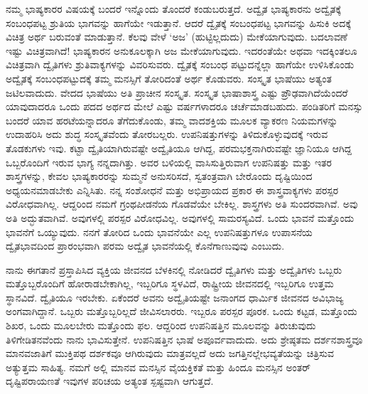 ನಮ್ಮ ಭಾಷ್ಯಕಾರರ ವಿಷಯಕ್ಕೆ ಬಂದರೆ ಇನ್ನೊಂದು ತೊಂದರೆ ಕಂಡುಬರುತ್ತದೆ. ಅದ್ವೈತ ಭಾಷ್ಯಕಾರನು ಅದ್ವೈತಕ್ಕೆ ಸಂಬಂಧಪಟ್ಟ ಶ್ರುತಿಯ ಭಾಗವನ್ನು ಹಾಗೆಯೇ ಇಡುತ್ತಾನೆ. ಆದರೆ ದ್ವೈತಕ್ಕೆ ಸಂಬಂಧಪಟ್ಟ ಭಾಗವನ್ನು ಹಿಸುಕಿ ಅದಕ್ಕೆ ವಿಚಿತ್ರ ಅರ್ಥ ಬರುವಂತೆ ಮಾಡುತ್ತಾನೆ. ಕೆಲವು ವೇಳೆ ‘ಅಜ’ (ಹುಟ್ಟಿಲ್ಲದುದು) ಮೇಕೆಯಾಗುವುದು. ಬದಲಾವಣೆ ಇಷ್ಟು ವಿಚಿತ್ರವಾಗಿದೆ! ಭಾಷ್ಯಕಾರನ ಅನುಕೂಲಕ್ಕಾಗಿ ಅಜ ಮೇಕೆಯಾಗುವುದು. ಇದರಂತೆಯೇ ಅಥವಾ ಇದಕ್ಕಿಂತಲೂ ವಿಚಿತ್ರವಾಗಿ ದ್ವೈತಿಗಳು ಶ್ರುತಿವಾಕ್ಯಗಳನ್ನು ವಿವರಿಸುವರು. ದ್ವೈತಕ್ಕೆ ಸಂಬಂಧ ಪಟ್ಟುದನ್ನೆಲ್ಲಾ ಹಾಗೆಯೇ ಉಳಿಸಿಕೊಂಡು ಅದ್ವೈತಕ್ಕೆ ಸಂಬಂಧಪಟ್ಟುದಕ್ಕೆ ತಮ್ಮ ಮನಸ್ಸಿಗೆ ತೋರಿದಂತೆ ಅರ್ಥ ಕೊಡುವರು. ಸಂಸ್ಕೃತ ಭಾಷೆಯು ಅತ್ಯಂತ ಜಟಿಲವಾದುದು. ವೇದದ ಭಾಷೆಯು ಅತಿ ಪ್ರಾಚೀನ ಸಂಸ್ಕೃತ. ಸಂಸ್ಕೃತ ಭಾಷಾಶಾಸ್ತ್ರ ಎಷ್ಟು ಪ್ರೌಢವಾಗಿದೆಯೆಂದರೆ ಯಾವುದಾದರೂ ಒಂದು ಪದದ ಅರ್ಥದ ಮೇಲೆ ಎಷ್ಟು ವರ್ಷಗಳಾದರೂ ಚರ್ಚೆಮಾಡಬಹುದು. ಪಂಡಿತರಿಗೆ ಮನಸ್ಸು ಬಂದರೆ ಯಾವ ಹರಟೆಯನ್ನಾದರೂ ತೆಗೆದುಕೊಂಡು, ತಮ್ಮ ವಾದಶಕ್ತಿಯ ಮೂಲಕ ವ್ಯಾಕರಣ ನಿಯಮಗಳನ್ನು ಉದಾಹರಿಸಿ ಅದು ಶುದ್ಧ ಸಂಸ್ಕೃತವೆಂದು ತೋರಬಲ್ಲರು. ಉಪನಿಷತ್ತುಗಳನ್ನು ತಿಳಿದುಕೊಳ್ಳುವುದಕ್ಕೆ ಇರುವ ತೊಡಕುಗಳು ಇವು. ಕಟ್ಟಾ ದ್ವೈತಿಯಾಗಿರುವಷ್ಟೇ ಅದ್ವೈತಿಯೂ ಆಗಿದ್ದ, ಪರಮಭಕ್ತನಾಗಿರುವಷ್ಟೇ ಜ್ಞಾನಿಯೂ ಆಗಿದ್ದ ಒಬ್ಬರೊಂದಿಗೆ ಇರುವ ಭಾಗ್ಯ ನನ್ನದಾಗಿತ್ತು. ಅವರ ಬಳಿಯಲ್ಲಿ ವಾಸಿಸುತ್ತಿರುವಾಗ ಉಪನಿಷತ್ತು ಮತ್ತು ಇತರ ಶಾಸ್ತ್ರಗಳನ್ನು, ಕೇವಲ ಭಾಷ್ಯಕಾರರನ್ನು ಸುಮ್ಮನೆ ಅನುಸರಿಸದೆ, ಸ್ವತಂತ್ರವಾಗಿ ಬೇರೊಂದು ದೃಷ್ಟಿಯಿಂದ ಅಧ್ಯಯನಮಾಡಬೇಕು ಎನ್ನಿಸಿತು. ನನ್ನ ಸಂಶೋಧನೆ ಮತ್ತು ಅಭಿಪ್ರಾಯದ ಪ್ರಕಾರ ಈ ಶಾಸ್ತ್ರವಾಕ್ಯಗಳು ಪರಸ್ಪರ ವಿರೋಧವಾಗಿಲ್ಲ. ಆದ್ದರಿಂದ ನಮಗೆ ಗ್ರಂಥಪೀಡನೆಯ ಗೊಡವೆಯೇ ಬೇಕಿಲ್ಲ. ಶಾಸ್ತ್ರಗಳು ಅತಿ ಸುಂದರವಾಗಿವೆ. ಅವು ಅತಿ ಅದ್ಭುತವಾಗಿವೆ. ಅವುಗಳಲ್ಲಿ ಪರಸ್ಪರ ವಿರೋಧವಿಲ್ಲ. ಅವುಗಳಲ್ಲಿ ಸಾಮರಸ್ಯವಿದೆ. ಒಂದು ಭಾವನೆ ಮತ್ತೊಂದು ಭಾವನೆಗೆ ಒಯ್ಯುವುದು. ನನಗೆ ತೋರಿದ ಒಂದು ಭಾವನೆಯೇ ಎಲ್ಲ ಉಪನಿಷತ್ತುಗಳೂ ಉಪಾಸನೆಯ ದ್ವೈತಭಾವದಿಂದ ಪ್ರಾರಂಭವಾಗಿ ಪರಮ ಅದ್ವೈತ ಭಾವನೆಯಲ್ಲಿ ಕೊನೆಗಾಣುವುವು ಎಂಬುದು.

ನಾನು ಈಗತಾನೆ ಪ್ರಸ್ತಾಪಿಸಿದ ವ್ಯಕ್ತಿಯ ಜೀವನದ ಬೆಳಕಿನಲ್ಲಿ ನೋಡಿದರೆ ದ್ವೈತಿಗಳು ಮತ್ತು ಅದ್ವೈತಿಗಳು ಒಬ್ಬರು ಮತ್ತೊಬ್ಬರೊಂದಿಗೆ ಹೋರಾಡಬೇಕಾಗಿಲ್ಲ, ಇಬ್ಬರಿಗೂ ಸ್ಥಳವಿದೆ, ರಾಷ್ಟ್ರೀಯ ಜೀವನದಲ್ಲಿ ಇಬ್ಬರಿಗೂ ಉತ್ತಮ ಸ್ಥಾನವಿದೆ. ದ್ವೈತಿಯೂ ಇರಬೇಕು. ಏಕೆಂದರೆ ಅವನು ಅದ್ವೈತಿಯಷ್ಟೇ ಜನಾಂಗದ ಧಾರ್ಮಿಕ ಜೀವನದ ಅವಿಭಾಜ್ಯ ಅಂಗವಾಗಿದ್ದಾನೆ. ಒಬ್ಬರು ಮತ್ತೊಬ್ಬರಿಲ್ಲದೆ ಜೀವಿಸಲಾರರು. ಇಬ್ಬರೂ ಪರಸ್ಪರ ಪೂರಕ. ಒಂದು ಕಟ್ಟಡ, ಮತ್ತೊಂದು ಶಿಖರ, ಒಂದು ಮೂಲಬೇರು ಮತ್ತೊಂದು ಫಲ. ಆದ್ದರಿಂದ ಉಪನಿಷತ್ತಿನ ಮೂಲವನ್ನು ತಿರುಚುವುದು ತಿಳಿಗೇಡಿತನವೆಂದು ನಾನು ಭಾವಿಸುತ್ತೇನೆ. ಉಪನಿಷತ್ತಿನ ಭಾಷೆ ಅಪೂರ್ವವಾದುದು. ಅದು ಶ್ರೇಷ್ಠತಮ ದರ್ಶನಶಾಸ್ತ್ರವೂ ಮಾನವಜಾತಿಗೆ ಮುಕ್ತಿಪಥ ದರ್ಶಕವೂ ಆಗಿರುವುದು ಮಾತ್ರವಲ್ಲದೆ ಅದು ಜಗತ್ತಿನಲ್ಲೇ\break ಭವ್ಯತೆಯನ್ನು ಚಿತ್ರಿಸುವ ಅತ್ಯುತ್ತಮ ಸಾಹಿತ್ಯ. ನಮಗೆ ಅಲ್ಲಿ ಮಾನವ ಮನಸ್ಸಿನ ವೈಯಕ್ತಿಕತೆ ಮತ್ತು ಹಿಂದೂ ಮನಸ್ಸಿನ ಅಂತರ್​ದೃಷ್ಟಿಪರಾಯಣತೆ ಇವುಗಳ ಪರಿಚಯ ಅತ್ಯಂತ ಸ್ಪಷ್ಟವಾಗಿ ಆಗುತ್ತದೆ.

